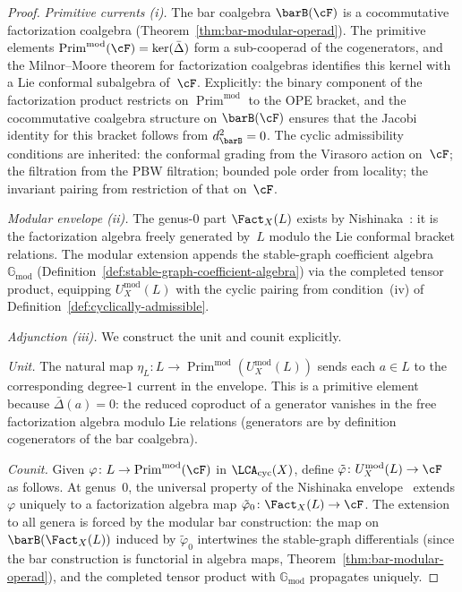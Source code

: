 \begin{proof}
\emph{Primitive currents (i).}
The bar coalgebra $\barB(\cF)$ is a cocommutative
factorization coalgebra
(Theorem~\ref{thm:bar-modular-operad}).  The
primitive elements $\operatorname{Prim}^{\mathrm{mod}}(\cF)
= \ker(\bar\Delta)$ form a sub-cooperad of the
cogenerators, and the Milnor--Moore theorem for
factorization coalgebras identifies this kernel with a Lie
conformal subalgebra of~$\cF$.  Explicitly: the binary
component of the factorization product restricts on
$\operatorname{Prim}^{\mathrm{mod}}$ to the OPE bracket,
and the cocommutative coalgebra structure on $\barB(\cF)$
ensures that the Jacobi identity for this bracket follows
from $d_{\barB}^2 = 0$.  The cyclic admissibility conditions
are inherited: the conformal grading from the Virasoro
action on~$\cF$; the filtration from the PBW filtration;
bounded pole order from locality; the invariant pairing
from restriction of that on~$\cF$.

\emph{Modular envelope (ii).}
The genus-$0$ part $\Fact_X(L)$ exists by
Nishinaka~\cite{Nish26}: it is the factorization algebra
freely generated by~$L$ modulo the Lie conformal bracket
relations.  The modular extension appends the
stable-graph coefficient algebra
$\mathbb{G}_{\mathrm{mod}}$
(Definition~\ref{def:stable-graph-coefficient-algebra})
via the completed tensor product, equipping
$U_X^{\mathrm{mod}}(L)$ with the cyclic pairing from
condition~(iv) of
Definition~\ref{def:cyclically-admissible}.

\emph{Adjunction (iii).}
We construct the unit and counit explicitly.

\emph{Unit.}  The natural map
$\eta_L \colon L \to
\operatorname{Prim}^{\mathrm{mod}}(U_X^{\mathrm{mod}}(L))$
sends each $a \in L$ to the corresponding degree-$1$ current
in the envelope.  This is a primitive element because
$\bar\Delta(a) = 0$: the reduced coproduct of a generator
vanishes in the free factorization algebra modulo Lie
relations (generators are by definition cogenerators of
the bar coalgebra).

\emph{Counit.}  Given $\varphi \colon L \to
\operatorname{Prim}^{\mathrm{mod}}(\cF)$ in
$\LCA_{\mathrm{cyc}}(X)$, define
$\tilde\varphi \colon U_X^{\mathrm{mod}}(L) \to \cF$
as follows.  At genus~$0$, the universal property of
the Nishinaka envelope~\cite{Nish26} extends $\varphi$
uniquely to a factorization algebra map
$\tilde\varphi_0 \colon \Fact_X(L) \to \cF$.
The extension to all genera is forced by the modular
bar construction: the map on $\barB(\Fact_X(L))$ induced
by $\tilde\varphi_0$ intertwines the stable-graph
differentials (since the bar construction is functorial
in algebra maps,
Theorem~\ref{thm:bar-modular-operad}), and the
completed tensor product with
$\mathbb{G}_{\mathrm{mod}}$ propagates uniquely.


\end{proof}

